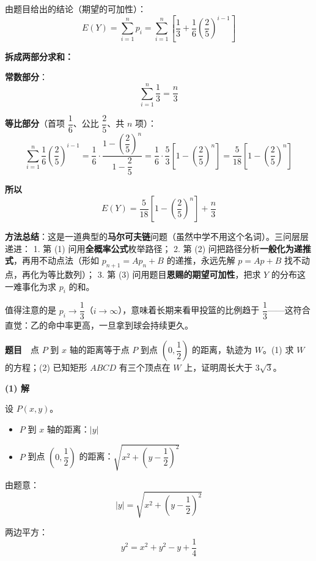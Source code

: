 由题目给出的结论（期望的可加性）：
\[E(Y)=\sum_{i=1}^{n}p_i=\sum_{i=1}^{n}\left[\frac13+\frac16\left(\frac25\right)^{i-1}\right]\]

\textbf{拆成两部分求和：}

\textbf{常数部分}：
\[\sum_{i=1}^{n}\frac13=\frac n3\]

\textbf{等比部分}（首项 $\dfrac16$、公比 $\dfrac25$、共 $n$ 项）：
\[\sum_{i=1}^{n}\frac16\left(\frac25\right)^{i-1}=\frac16\cdot\frac{1-\left(\dfrac25\right)^{n}}{1-\dfrac25}=\frac16\cdot\frac53\left[1-\left(\frac25\right)^{n}\right]=\frac5{18}\left[1-\left(\frac25\right)^{n}\right]\]

\textbf{所以}
\[E(Y)=\frac5{18}\left[1-\left(\frac25\right)^{n}\right]+\frac n3\]

\begin{gktip}
\textbf{方法总结}：这是一道典型的\textbf{马尔可夫链}问题（虽然中学不用这个名词）。三问层层递进：
1. 第 (1) 问用\textbf{全概率公式}枚举路径；
2. 第 (2) 问把路径分析\textbf{一般化为递推式}，再用不动点法（形如 $p_{n+1}=Ap_n+B$ 的递推，永远先解 $p=Ap+B$ 找不动点，再化为等比数列）；
3. 第 (3) 问用题目\textbf{恩赐的期望可加性}，把求 $Y$ 的分布这一难事化为求 $p_i$ 的和。

值得注意的是 $p_i\to\dfrac13$（$i\to\infty$），意味着长期来看甲投篮的比例趋于 $\dfrac13$——这符合直觉：乙的命中率更高，一旦拿到球会持续更久。
\end{gktip}

\par\medskip


\textbf{题目}　点 $P$ 到 $x$ 轴的距离等于点 $P$ 到点 $\left(0,\dfrac12\right)$ 的距离，轨迹为 $W$。(1) 求 $W$ 的方程；(2) 已知矩形 $ABCD$ 有三个顶点在 $W$ 上，证明周长大于 $3\sqrt3$。

\par\medskip

\textbf{(1) 解}

设 $P(x,y)$。

\begin{itemize}
\item $P$ 到 $x$ 轴的距离：$|y|$
\item $P$ 到点 $\left(0,\dfrac12\right)$ 的距离：$\sqrt{x^{2}+\left(y-\dfrac12\right)^{2}}$
\end{itemize}

由题意：
\[|y|=\sqrt{x^{2}+\left(y-\frac12\right)^{2}}\]

两边平方：
\[y^{2}=x^{2}+y^{2}-y+\frac14\]

